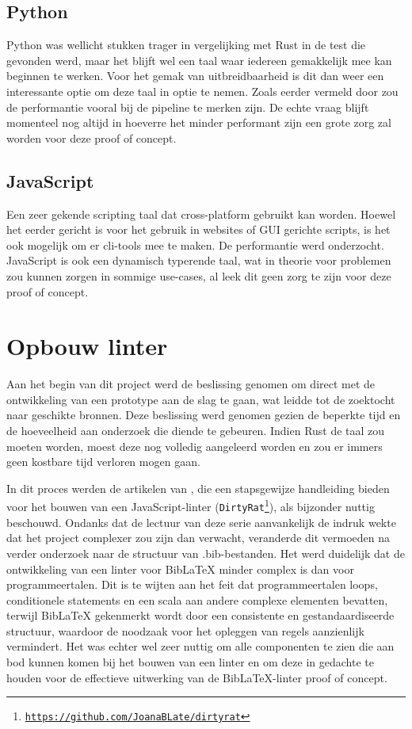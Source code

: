 \subsection{Python}
Python was wellicht stukken trager in vergelijking met Rust in de test die gevonden werd, maar het blijft wel een taal waar iedereen gemakkelijk mee kan beginnen te werken. Voor het gemak van uitbreidbaarheid is dit dan weer een interessante optie om deze taal in optie te nemen. Zoals eerder vermeld door \textcite{TurnerTrauring2023} zou de performantie vooral bij de pipeline te merken zijn.
De echte vraag blijft momenteel nog altijd in hoeverre het minder performant zijn een grote zorg zal worden voor deze proof of concept.

\subsection{JavaScript}
Een zeer gekende scripting taal dat cross-platform gebruikt kan worden. Hoewel het eerder gericht is voor het gebruik in websites of \acrshort{GUI} gerichte scripts, is het ook mogelijk om er cli-tools mee te maken. De performantie werd onderzocht. JavaScript is ook een dynamisch typerende taal, wat in theorie voor problemen zou kunnen zorgen in sommige use-cases, al leek dit geen zorg te zijn voor deze proof of concept\autocite{Simpson2023}.

\section{Opbouw linter}
\label{sec:linteropbouw}
Aan het begin van dit project werd de beslissing genomen om direct met de ontwikkeling van een prototype aan de slag te gaan, wat leidde tot de zoektocht naar geschikte bronnen. Deze beslissing werd genomen gezien de beperkte tijd en de hoeveelheid aan onderzoek die diende te gebeuren. Indien Rust de taal zou moeten worden, moest deze nog volledig aangeleerd worden en zou er immers geen kostbare tijd verloren mogen gaan.

In dit proces werden de artikelen van \textcite{BorgesLate2021}, die een stapsgewijze handleiding bieden voor het bouwen van een JavaScript-linter (\texttt{DirtyRat\footnote{\url{https://github.com/JoanaBLate/dirtyrat}}}), als bijzonder nuttig beschouwd. Ondanks dat de lectuur van deze serie aanvankelijk de indruk wekte dat het project complexer zou zijn dan verwacht, veranderde dit vermoeden na verder onderzoek naar de structuur van .bib-bestanden. Het werd duidelijk dat de ontwikkeling van een linter voor BibLaTeX minder complex is dan voor programmeertalen. Dit is te wijten aan het feit dat programmeertalen loops, conditionele statements en een scala aan andere complexe elementen bevatten, terwijl BibLaTeX gekenmerkt wordt door een consistente en gestandaardiseerde structuur, waardoor de noodzaak voor het opleggen van regels aanzienlijk vermindert. Het was echter wel zeer nuttig om alle componenten te zien die aan bod kunnen komen bij het bouwen van een linter en om deze in gedachte te houden voor de effectieve uitwerking van de BibLaTeX-linter proof of concept.

